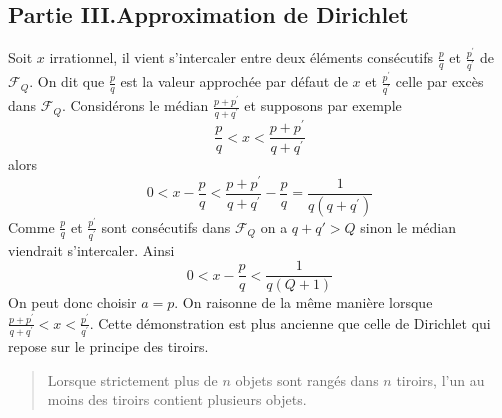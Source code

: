 \subsection*{Partie III.\quad Approximation de Dirichlet}
Soit $x$ irrationnel, il vient s'intercaler entre deux {\'e}l{\'e}ments cons{\'e}cutifs $\frac{p}{q}$ et $\frac{p^{\prime }}{q^{\prime }}$ de $\mathcal{F}_{Q}$. On dit que $\frac{p}{q}$ est la valeur approch{\'e}e par d{\'e}faut
de $x$ et $\frac{p^{\prime }}{q^{\prime }}$ celle par exc{\`e}s dans $\mathcal{F}_{Q}$. Consid{\'e}rons le m{\'e}dian $\frac{p+p^{\prime }}{q+q^{\prime }}$ et supposons par exemple
\[
\frac{p}{q}<x<\frac{p+p^{\prime }}{q+q^{\prime }}
\]
alors
\[
0<x-\frac{p}{q}<\frac{p+p^{\prime }}{q+q^{\prime }}-\frac{p}{q}=\frac{1}{q(q+q^{\prime })}
\]
Comme $\frac{p}{q}$ et $\frac{p^{\prime }}{q^{\prime }}$ sont cons{\'e}cutifs dans $\mathcal{F}_{Q}$ on a $q+q'>Q$ sinon le m{\'e}dian
viendrait s'intercaler. Ainsi
\[
0<x-\frac{p}{q}<\frac{1}{q(Q+1)}
\]
On peut donc choisir $a=p.$ On raisonne de la m{\^e}me mani{\`e}re lorsque $\frac{p+p^{\prime }}{q+q^{\prime }}<x<\frac{p^{\prime }}{q^{\prime }}$.\newline
Cette d{\'e}monstration est plus ancienne que celle de Dirichlet qui repose sur le principe des tiroirs.
\begin{quote}Lorsque strictement plus de $n$ objets sont rang{\'e}s dans $n$ tiroirs, l'un au moins des tiroirs contient plusieurs objets.
\end{quote}
